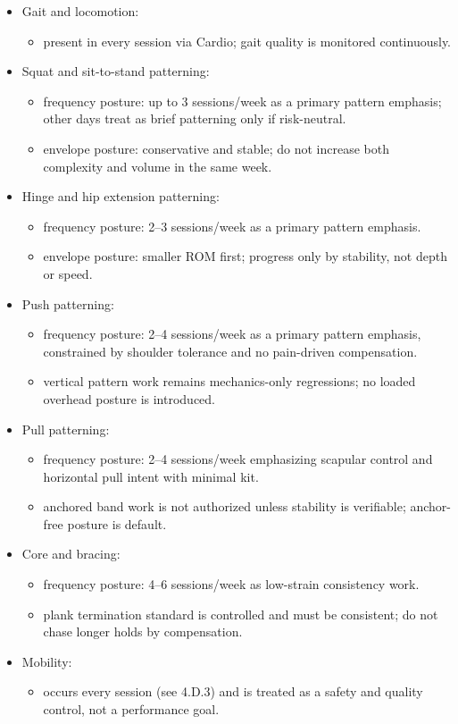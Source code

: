 \documentclass[10pt]{article}
\begin{document}
\begin{itemize}
\item Gait and locomotion:
  \begin{itemize}
  \item present in every session via Cardio; gait quality is monitored continuously.
  \end{itemize}
\item Squat and sit-to-stand patterning:
  \begin{itemize}
  \item frequency posture: up to 3 sessions/week as a primary pattern emphasis; other days treat as brief patterning only if risk-neutral.
  \item envelope posture: conservative and stable; do not increase both complexity and volume in the same week.
  \end{itemize}
\item Hinge and hip extension patterning:
  \begin{itemize}
  \item frequency posture: 2–3 sessions/week as a primary pattern emphasis.
  \item envelope posture: smaller ROM first; progress only by stability, not depth or speed.
  \end{itemize}
\item Push patterning:
  \begin{itemize}
  \item frequency posture: 2–4 sessions/week as a primary pattern emphasis, constrained by shoulder tolerance and no pain-driven compensation.
  \item vertical pattern work remains mechanics-only regressions; no loaded overhead posture is introduced.
  \end{itemize}
\item Pull patterning:
  \begin{itemize}
  \item frequency posture: 2–4 sessions/week emphasizing scapular control and horizontal pull intent with minimal kit.
  \item anchored band work is not authorized unless stability is verifiable; anchor-free posture is default.
  \end{itemize}
\item Core and bracing:
  \begin{itemize}
  \item frequency posture: 4–6 sessions/week as low-strain consistency work.
  \item plank termination standard is controlled and must be consistent; do not chase longer holds by compensation.
  \end{itemize}
\item Mobility:
  \begin{itemize}
  \item occurs every session (see 4.D.3) and is treated as a safety and quality control, not a performance goal.
  \end{itemize}
\end{itemize}
\end{document}
